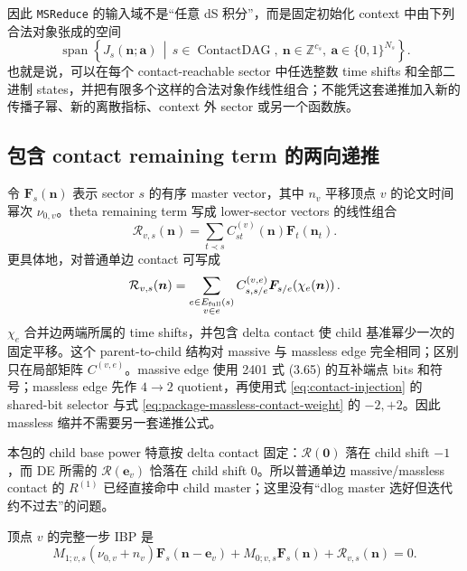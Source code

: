 \documentclass[11pt,a4paper]{ctexart}
\newcommand{\cR}{\mathcal R}
\begin{document}
因此 \texttt{MSReduce} 的输入域不是“任意 dS 积分”，而是固定初始化 context 中由下列合法对象张成的空间
\begin{equation}
 \boxed{
 \operatorname{span}\!\left\{
 J_s(\bm n;\bm a)\,\middle|\,
 s\in\operatorname{ContactDAG},\
 \bm n\in\mathbb Z^{c_s},\
 \bm a\in\{0,1\}^{N_s}
 \right\}.
 }
 \label{eq:MSReduce-domain}
\end{equation}
也就是说，可以在每个 contact-reachable sector 中任选整数 time shifts 和全部二进制 states，并把有限多个这样的合法对象作线性组合；不能凭这套递推加入新的传播子幂、新的离散指标、context 外 sector 或另一个函数族。

\subsection{包含 contact remaining term 的两向递推}

令 $\bm F_s(\bm n)$ 表示 sector $s$ 的有序 master vector，其中 $n_v$ 平移顶点 $v$ 的论文时间幂次 $\nu_{0,v}$。theta remaining term 写成 lower-sector vectors 的线性组合
\begin{equation}
 \cR_{v,s}(\bm n)
 =\sum_{t\prec s}C_{st}^{(v)}(\bm n)\bm F_t(\bm n_t).
 \label{eq:R-as-CF}
\end{equation}
更具体地，对普通单边 contact 可写成
\begin{equation}
 \cR_{v,s}(\bm n)
 =\sum_{\substack{e\in E_{\rm full}(s)\\v\in e}}
 C_{s,s/e}^{(v,e)}
 \bm F_{s/e}\!\left(\chi_e(\bm n)\right).
 \label{eq:R-edge-sum}
\end{equation}
$\chi_e$ 合并边两端所属的 time shifts，并包含 delta contact 使 child 基准幂少一次的固定平移。这个 parent-to-child 结构对 massive 与 massless edge 完全相同；区别只在局部矩阵 $C^{(v,e)}$。massive edge 使用 2401 式 (3.65) 的互补端点 bits 和符号；massless edge 先作 $4\to2$ quotient，再使用式 \eqref{eq:contact-injection} 的 shared-bit selector 与式 \eqref{eq:package-massless-contact-weight} 的 $-2,+2$。因此 massless 缩并不需要另一套递推公式。

本包的 child base power 特意按 delta contact 固定：$\cR(\bm0)$ 落在 child shift $-1$，而 DE 所需的 $\cR(\bm e_v)$ 恰落在 child shift $0$。所以普通单边 massive/massless contact 的 $R^{(1)}$ 已经直接命中 child master；这里没有“dlog master 选好但迭代约不过去”的问题。

顶点 $v$ 的完整一步 IBP 是
\begin{equation}
 M_{1;v,s}(\nu_{0,v}+n_v)\bm F_s(\bm n-\bm e_v)
 +M_{0;v,s}\bm F_s(\bm n)
 +\cR_{v,s}(\bm n)=0.
 \label{eq:global-one-step-ibp}
\end{equation}
\end{document}
